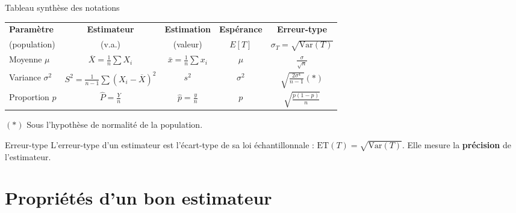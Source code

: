 \documentclass{BeamerTemplate}
\begin{document}
\begin{frame}[t]{Tableau synthèse des notations}
  \centering
  \small
  \renewcommand{\arraystretch}{1.15}
  \begin{tabular}{lcccc}\toprule
    \textbf{Paramètre} & \textbf{Estimateur} & \textbf{Estimation} & \textbf{Espérance} & \textbf{Erreur-type} \\
    (population) & (v.a.) & (valeur) & $E[T]$ & $\sigma_T = \sqrt{\text{Var}(T)}$ \\ \midrule
    Moyenne $\mu$ & $\overline{X} = \frac{1}{n}\sum X_i$ & $\bar{x} = \frac{1}{n}\sum x_i$ & $\mu$ & $\frac{\sigma}{\sqrt{n}}$ \\[2mm]
    Variance $\sigma^2$ & $S^2 = \frac{1}{n-1}\sum (X_i - \overline{X})^2$ & $s^2$ & $\sigma^2$ & $\sqrt{\frac{2\sigma^4}{n-1}}$\;$(*)$ \\[2mm]
    Proportion $p$ & $\widehat{P} = \frac{Y}{n}$ & $\hat{p} = \frac{y}{n}$ & $p$ & $\sqrt{\frac{p(1-p)}{n}}$ \\ \bottomrule
  \end{tabular}

  \raggedright
  {\scriptsize $(*)$ Sous l'hypothèse de normalité de la population.}

  \smallskip
  \begin{Boite}{Erreur-type}
    L'\alert{erreur-type} d'un estimateur est l'écart-type de sa loi échantillonnale : $\text{ET}(T) = \sqrt{\text{Var}(T)}$. Elle mesure la \textbf{précision} de l'estimateur.
  \end{Boite}
\end{frame}

\section{Propriétés d'un bon estimateur}
\end{document}
